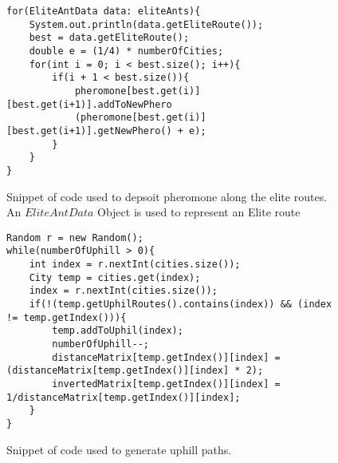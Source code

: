 \begin{figure}[H]
\begin{lstlisting}
for(EliteAntData data: eliteAnts){
	System.out.println(data.getEliteRoute());
	best = data.getEliteRoute();
	double e = (1/4) * numberOfCities;
	for(int i = 0; i < best.size(); i++){
		if(i + 1 < best.size()){
			pheromone[best.get(i)][best.get(i+1)].addToNewPhero
			(pheromone[best.get(i)][best.get(i+1)].getNewPhero() + e);
		}
	}
}
\end{lstlisting}
\caption[Elite Route Pheromone Deposit Code]{Snippet of code used to depsoit pheromone along the elite routes. An $EliteAntData$ Object is used to represent an Elite route}
\label{elitePhero}
\end{figure}

\begin{figure}[H]
\begin{lstlisting}
Random r = new Random();
while(numberOfUphill > 0){
	int index = r.nextInt(cities.size());
	City temp = cities.get(index);
	index = r.nextInt(cities.size());
	if(!(temp.getUphilRoutes().contains(index)) && (index != temp.getIndex())){
		temp.addToUphil(index);
		numberOfUphill--;
		distanceMatrix[temp.getIndex()][index] = (distanceMatrix[temp.getIndex()][index] * 2);
		invertedMatrix[temp.getIndex()][index] = 1/distanceMatrix[temp.getIndex()][index];
	}
}
\end{lstlisting}
\caption[Uphill Path Generation Code]{Snippet of code used to generate uphill paths.}
\label{suchUphill}
\end{figure}


